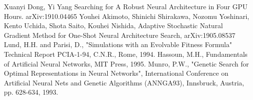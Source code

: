 \documentclass[conference]{IEEEtran}
\begin{document}
\begin{thebibliography}{00}
 Xuanyi Dong, Yi Yang Searching for A Robust Neural Architecture in Four GPU Hours. arXiv:1910.04465
 Youhei Akimoto, Shinichi Shirakawa, Nozomu Yoshinari, Kento Uchida, Shota Saito, Kouhei Nishida, Adaptive Stochastic Natural Gradient Method for One-Shot Neural Architecture Search, arXiv:1905.08537
 Lund, H.H. and Parisi, D., "Simulations with an Evolvable Fitness Formula" Technical Report PCIA-1-94, C.N.R., Rome, 1994.
 Hassoun, M.H., Fundamentals of Artificial Neural Networks, MIT Press, 1995.
 Munro, P.W., "Genetic Search for Optimal Representations in Neural Networks", International Conference on Artificial Neural Nets and Genetic Algorithms (ANNGA93), Innsbruck, Austria, pp. 628-634, 1993.
\end{thebibliography}
\end{document}
